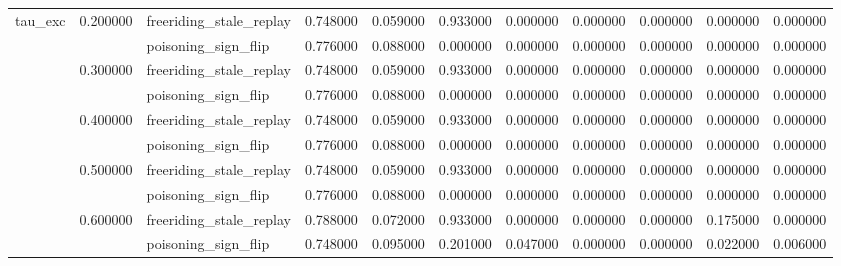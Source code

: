 \begin{tabular}{lllrrrrrrrr}
\cline{1-11} \cline{2-11}
\multirow[t]{10}{*}{tau_exc} & \multirow[t]{2}{*}{0.200000} & freeriding_stale_replay & 0.748000 & 0.059000 & 0.933000 & 0.000000 & 0.000000 & 0.000000 & 0.000000 & 0.000000 \\
 &  & poisoning_sign_flip & 0.776000 & 0.088000 & 0.000000 & 0.000000 & 0.000000 & 0.000000 & 0.000000 & 0.000000 \\
\cline{2-11}
 & \multirow[t]{2}{*}{0.300000} & freeriding_stale_replay & 0.748000 & 0.059000 & 0.933000 & 0.000000 & 0.000000 & 0.000000 & 0.000000 & 0.000000 \\
 &  & poisoning_sign_flip & 0.776000 & 0.088000 & 0.000000 & 0.000000 & 0.000000 & 0.000000 & 0.000000 & 0.000000 \\
\cline{2-11}
 & \multirow[t]{2}{*}{0.400000} & freeriding_stale_replay & 0.748000 & 0.059000 & 0.933000 & 0.000000 & 0.000000 & 0.000000 & 0.000000 & 0.000000 \\
 &  & poisoning_sign_flip & 0.776000 & 0.088000 & 0.000000 & 0.000000 & 0.000000 & 0.000000 & 0.000000 & 0.000000 \\
\cline{2-11}
 & \multirow[t]{2}{*}{0.500000} & freeriding_stale_replay & 0.748000 & 0.059000 & 0.933000 & 0.000000 & 0.000000 & 0.000000 & 0.000000 & 0.000000 \\
 &  & poisoning_sign_flip & 0.776000 & 0.088000 & 0.000000 & 0.000000 & 0.000000 & 0.000000 & 0.000000 & 0.000000 \\
\cline{2-11}
 & \multirow[t]{2}{*}{0.600000} & freeriding_stale_replay & 0.788000 & 0.072000 & 0.933000 & 0.000000 & 0.000000 & 0.000000 & 0.175000 & 0.000000 \\
 &  & poisoning_sign_flip & 0.748000 & 0.095000 & 0.201000 & 0.047000 & 0.000000 & 0.000000 & 0.022000 & 0.006000 \\
\cline{1-11} \cline{2-11}
\bottomrule
\end{tabular}
